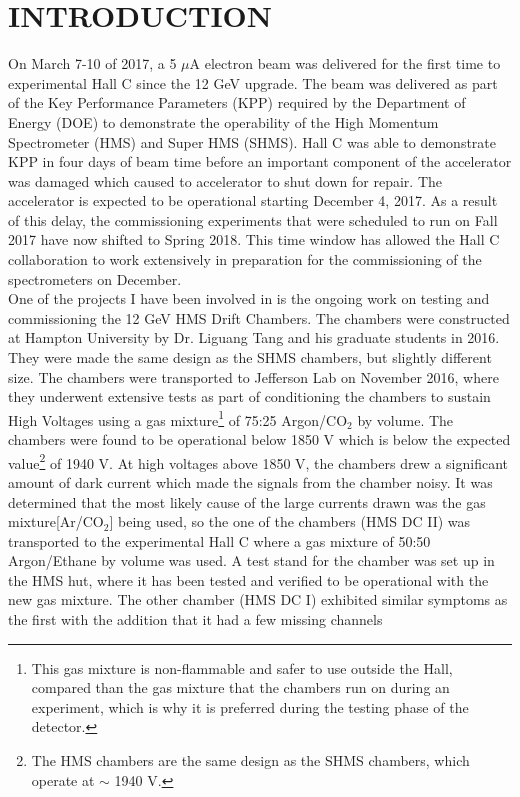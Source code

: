 \documentclass[letterpaper, 12 pt, conference]{ieeeconf}  %
\begin{document}
\section{INTRODUCTION}
\noindent On March 7-10 of 2017, a 5 $\mu$A electron beam was delivered for the first time to experimental
Hall C since the 12 GeV upgrade. The beam was delivered as part of the Key Performance Parameters (KPP) required by the
Department of Energy (DOE) to demonstrate the operability of the High Momentum Spectrometer (HMS) and Super HMS (SHMS). 
Hall C was able to demonstrate KPP in four days of beam time before an important component of the accelerator was damaged which
caused to accelerator to shut down for repair. The accelerator is expected to be operational starting December 4, 2017. As a
result of this delay, the commissioning experiments that were scheduled to run on Fall 2017 have now shifted to Spring 2018.
This time window has allowed the Hall C collaboration to work extensively in preparation for the commissioning of the
spectrometers on December. \\
\indent One of the projects I have been involved in is the ongoing work on testing and commissioning the 12 GeV HMS Drift
Chambers. The chambers were constructed at Hampton University by Dr. Liguang Tang and his graduate students in 2016\cite{bishnu}.
They were made the same design as the SHMS chambers, but slightly different size. The chambers were transported to Jefferson Lab on November 2016,
where they underwent extensive tests as part of conditioning the chambers to sustain High Voltages using a gas mixture\footnote{This gas mixture is non-flammable and
safer to use outside the Hall, compared than the gas mixture that the chambers run on during an experiment, which is why it is preferred during the testing phase of the detector.}
of 75:25 Argon/CO$_{2}$ by volume. The chambers were found to be operational below 1850 V which is below the expected value\footnote{The HMS chambers
are the same design as the SHMS chambers, which operate at $\sim$ 1940 V.} of 1940 V. At high voltages above 1850 V, the chambers drew a significant amount of
dark current which made the signals from the chamber noisy.
It was determined that the most likely cause of the large currents drawn was the gas mixture[Ar/CO$_{2}$] being used, so the one of the chambers (HMS DC II) was transported to the
experimental Hall C where a gas mixture of 50:50 Argon/Ethane by volume was used. A test stand for the chamber was set up in the HMS hut, where it has been tested and
verified to be operational with the new gas mixture. The other chamber (HMS DC I) exhibited similar symptoms as the first with the addition that it had a few missing channels
\end{document}
